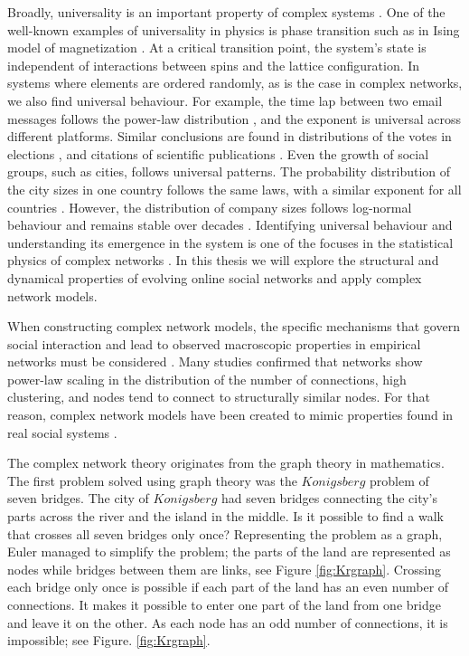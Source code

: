 Broadly, universality is an important property of complex systems \cite{binney1992}. One of the well-known examples of universality in physics is phase transition such as in Ising model of magnetization \cite{sethna2021statistical}. At a critical transition point, the system's state is independent of interactions between spins and the lattice configuration. %
In systems where elements are ordered randomly, as is the case in complex networks, we also find universal behaviour. For example, the time lap between two email messages follows the power-law distribution \cite{garas2012emotional}, and the exponent is universal across different platforms. Similar conclusions are found in distributions of the votes in elections \cite{fortunato2007scaling, chatterjee2013}, and citations of scientific publications \cite{radicchi2008}. Even the growth of social groups, such as cities, follows universal patterns. The probability distribution of the city sizes in one country follows the same laws, with a similar exponent for all countries \cite{barthelemy2019, fazio2015pareto}. However, the distribution of company sizes follows log-normal behaviour and remains stable over decades \cite{amaral1997scaling, stanley1996scaling}. Identifying universal behaviour and understanding its emergence in the system is one of the focuses in the statistical physics of complex networks \cite{verbavatz2020}. %
In this thesis we will explore the structural and dynamical properties of evolving online social networks and apply complex network models.  

When constructing complex network models, the specific mechanisms that govern social interaction and lead to observed macroscopic properties in empirical networks must be considered \cite{sen2014sociophysics}. Many studies confirmed that networks show power-law scaling in the distribution of the number of connections, high clustering, and nodes tend to connect to structurally similar nodes. For that reason, complex network models have been created to mimic properties found in real social systems \cite{sen2014sociophysics}.

The complex network theory originates from the graph theory in mathematics. The first problem solved using graph theory was the $Konigsberg$ problem of seven bridges. The city of $Konigsberg$ had seven bridges connecting the city's parts across the river and the island in the middle. Is it possible to find a walk that crosses all seven bridges only once? Representing the problem as a graph, Euler managed to simplify the problem; the parts of the land are represented as nodes while bridges between them are links, see Figure \ref{fig:Krgraph}. Crossing each bridge only once is possible if each part of the land has an even number of connections. It makes it possible to enter one part of the land from one bridge and leave it on the other. As each node has an odd number of connections, it is impossible; see Figure. \ref{fig:Krgraph}.

